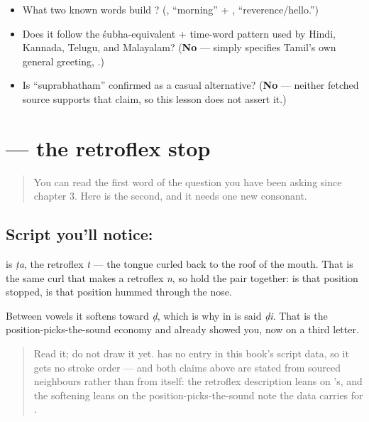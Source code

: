 \begin{tcolorbox}[breakable,colback=teal!4,colframe=teal!35!black,title={Before you move on}]
\begin{itemize}
\raggedright
  \item What two known words build  ? (\textbf{}, \textquotedblleft{}morning\textquotedblright{} + \textbf{}, \textquotedblleft{}reverence/hello.\textquotedblright{})
  \item Does it follow the śubha-equivalent + time-word pattern used by Hindi, Kannada, Telugu, and Malayalam? (\textbf{No} —  simply specifies Tamil's own general greeting, .)
  \item Is \textquotedblleft{}suprabhatham\textquotedblright{} confirmed as a casual alternative? (\textbf{No} — neither fetched source supports that claim, so this lesson does not assert it.)
\end{itemize}
\end{tcolorbox}
\section[\texorpdfstring{\ta{எப்படி} (eppaḍi)}{எப்படி (eppaḍi)}]{ — the retroflex stop}

\label{lesson:TA-W12-read-eppadi}



\begin{quote}
You can read the first word of the question you have been asking since chapter 3. Here is the second, and it needs one new consonant.
\end{quote}

\subsection*{Script you'll notice: }
\textbf{} is \emph{ṭa}, the retroflex \emph{t} — the tongue curled back to the roof of the mouth. That is the same curl that makes \textbf{} a retroflex \emph{n}, so hold the pair together: \textbf{} is that position stopped, \textbf{} is that position hummed through the nose.

Between vowels it softens toward \emph{ḍ}, which is why \textbf{} in \textbf{} is said \emph{ḍi}. That is the position-picks-the-sound economy \textbf{} and \textbf{} already showed you, now on a third letter.

\begin{quote}
Read it; do not draw it yet. \textbf{} has no entry in this book's script data, so it gets no stroke order — and both claims above are stated from sourced neighbours rather than from \textbf{} itself: the retroflex description leans on \textbf{}'s, and the softening leans on the position-picks-the-sound note the data carries for \textbf{}.
\end{quote}

